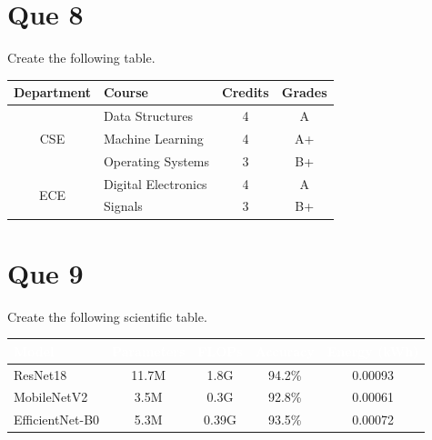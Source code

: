 \documentclass{article}
\begin{document}
	\section*{Que 8} 
	Create the following table. 	
	\begin{center}
		\begin{tabular}{|c|l|c|c|}
			\hline
			Department & Course & Credits & Grades \\
			\hline
			\multirow{3}{3em}{CSE} &  Data Structures & 4 & A\\
			& Machine Learning & 4 & A+\\
			& Operating Systems & 3 & B+\\
			\hline
			\multirow{2}{2em}{ECE} &  Digital Electronics & 4 & A\\
			& Signals & 3 & B+\\
			\hline
		\end{tabular}
	\end{center}
	
	\section*{Que 9}
	Create the following scientific table.
	\begin{center}
		\begin{tabular}{|l|c|c|c|c|}
			\hline
			\rowcolor{blue}
			\textbf{\textcolor{white}{Model}} & 
			\textbf{\textcolor{white}{Parameters}} & 
			\textbf{\textcolor{white}{FLOPs}} & 
			\textbf{\textcolor{white}{Accuracy}} & 
			\textbf{\textcolor{white}{Energy (kWh)}} \\ 
			\hline
			\rowcolor{cyan}
			ResNet18 & 11.7M & 1.8G & 94.2\% & 0.00093 \\ 
			\hline
			MobileNetV2 & 3.5M & 0.3G & 92.8\% & 0.00061 \\ 
			\hline
			\rowcolor{cyan}
			EfficientNet-B0  & 5.3M & 0.39G & 93.5\% & 0.00072 \\ 
			\hline
		\end{tabular}
	\end{center}
	
\end{document}
